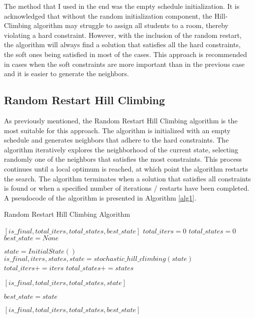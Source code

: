 \documentclass[runningheads]{paper}
\begin{document}
The method that I used in 
the end was the empty schedule initialization. It is acknowledged that without 
the random initialization component, the Hill-Climbing algorithm may struggle 
to assign all students to a room, thereby violating a hard constraint. However,
with  the inclusion of the random restart, the algorithm will always find a 
solution that satisfies all the hard constraints, the soft ones being satisfied 
in most of the cases. This approach is recommended in cases when the soft 
constraints are more important than in the previous case and it is easier to 
generate the neighbors.


\subsection{Random Restart Hill Climbing}

As previously mentioned, the Random Restart Hill Climbing algorithm is the 
most suitable for this approach. The algorithm is initialized with an empty
schedule and generates neighbors that adhere to the hard constraints. The
algorithm iteratively explores the neighborhood of the current state, selecting
randomly one of the neighbors that satisfies the most constraints. This process continues until
a local optimum is reached, at which point the algorithm restarts the search.
The algorithm terminates when a solution that
satisfies all constraints is found or when a specified number of iterations / 
restarts have been completed. A pseudocode of the algorithm is presented in Algorithm
\ref{alg1}.

\begin{algorithm}
\caption{Random Restart Hill Climbing Algorithm}
\label{alg1}
\begin{algorithmic}[1]
 \Return $[is\_final, total\_iters, total\_states, best\_state] $ 
\State $total\_iters = 0$
\State $total\_states = 0$
\State $best\_state = None$

\State $state = InitialState()$
\State $is\_final, iters, states, state = stochastic\_hill\_climbing(state)$
\State $total\_iters += iters$
\State $total\_states += states$

\State \Return $[is\_final, total\_iters, total\_states, state]$
\EndIf


\State $best\_state = state$
\EndIf
\EndIf
\EndFor

\State \Return $[is\_final, total\_iters, total\_states, best\_state]$

\end{algorithmic}
\end{algorithm}
\end{document}
